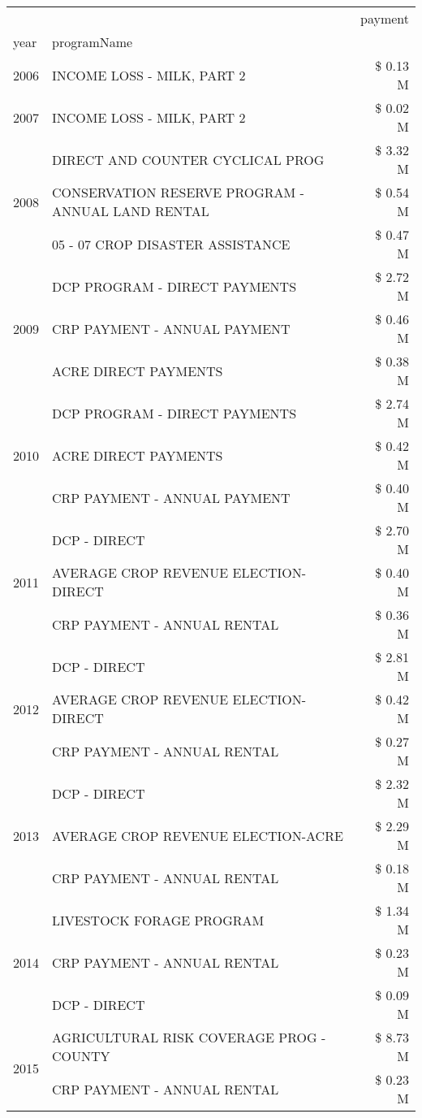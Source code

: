 \begin{tabular}{llr}
\toprule
 &  & payment \\
year & programName &  \\
\midrule
2006 & INCOME LOSS - MILK, PART 2 & \$ 0.13 M \\
\cline{1-3}
2007 & INCOME LOSS - MILK, PART 2 & \$ 0.02 M \\
\cline{1-3}
\multirow[t]{3}{*}{2008} & DIRECT AND COUNTER CYCLICAL PROG & \$ 3.32 M \\
 & CONSERVATION RESERVE PROGRAM - ANNUAL LAND RENTAL & \$ 0.54 M \\
 & 05 - 07 CROP DISASTER ASSISTANCE & \$ 0.47 M \\
\cline{1-3}
\multirow[t]{3}{*}{2009} & DCP PROGRAM - DIRECT PAYMENTS & \$ 2.72 M \\
 & CRP PAYMENT - ANNUAL PAYMENT & \$ 0.46 M \\
 & ACRE DIRECT PAYMENTS & \$ 0.38 M \\
\cline{1-3}
\multirow[t]{3}{*}{2010} & DCP PROGRAM - DIRECT PAYMENTS & \$ 2.74 M \\
 & ACRE DIRECT PAYMENTS & \$ 0.42 M \\
 & CRP PAYMENT - ANNUAL PAYMENT & \$ 0.40 M \\
\cline{1-3}
\multirow[t]{3}{*}{2011} & DCP - DIRECT & \$ 2.70 M \\
 & AVERAGE CROP REVENUE ELECTION-DIRECT & \$ 0.40 M \\
 & CRP PAYMENT - ANNUAL RENTAL & \$ 0.36 M \\
\cline{1-3}
\multirow[t]{3}{*}{2012} & DCP - DIRECT & \$ 2.81 M \\
 & AVERAGE CROP REVENUE ELECTION-DIRECT & \$ 0.42 M \\
 & CRP PAYMENT - ANNUAL RENTAL & \$ 0.27 M \\
\cline{1-3}
\multirow[t]{3}{*}{2013} & DCP - DIRECT & \$ 2.32 M \\
 & AVERAGE CROP REVENUE ELECTION-ACRE & \$ 2.29 M \\
 & CRP PAYMENT - ANNUAL RENTAL & \$ 0.18 M \\
\cline{1-3}
\multirow[t]{3}{*}{2014} & LIVESTOCK FORAGE PROGRAM & \$ 1.34 M \\
 & CRP PAYMENT - ANNUAL RENTAL & \$ 0.23 M \\
 & DCP - DIRECT & \$ 0.09 M \\
\cline{1-3}
\multirow[t]{3}{*}{2015} & AGRICULTURAL RISK COVERAGE PROG - COUNTY & \$ 8.73 M \\
 & CRP PAYMENT - ANNUAL RENTAL & \$ 0.23 M \\

\end{tabular}
